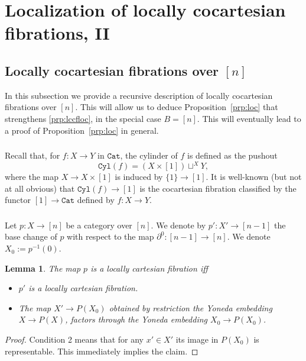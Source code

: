 \documentclass[12pt]{amsart}%
\newtheorem{lem}[subsubsection]{Lemma}
\newcommand{\Cat}{\mathtt{Cat}}
\newcommand{\Cyl}{\mathtt{Cyl}}
\begin{document}
\section{Localization of locally cocartesian fibrations, II}
\label{sec:strong}

\subsection{Locally cocartesian fibrations over $[n]$}

In this subsection we provide a recursive description of locally cocartesian fibrations over $[n]$. This will allow us to deduce
Proposition~\ref{prp:loc} that strengthens \ref{prp:lccfloc}, in the special case $B=[n]$. This will eventually lead to a proof of
Proposition~\ref{prp:loc} in general.

\subsubsection{}
Recall that, for $f:X\to Y$ in $\Cat$, the cylinder of $f$ is defined
as the pushout
$$
\Cyl(f)=(X\times[1])\sqcup^XY,
$$
where the map $X\to X\times[1]$ is induced by $\{1\}\to[1]$.
 It is well-known (but not at all obvious) that $\Cyl(f)\to[1]$ is the cocartesian fibration classified by the functor $[1]\to\Cat$ defined by
$f:X\to Y$. 

\subsubsection{}





Let $p:X\to[n]$ be a category over $[n]$. We denote by
$p':X'\to[n-1]$ the base change of $p$ with respect to
the map $\partial^0:[n-1]\to[n]$. We denote $X_0:=p^{-1}(0)$.
\begin{lem} The map $p$ is a locally cartesian fibration iff
\begin{itemize}
\item[1.] $p'$ is a locally cartesian fibration.
\item[2.] The map $X'\to P(X_0)$ obtained by restriction the Yoneda embedding $X\to P(X)$, factors through the Yoneda embedding $X_0\to P(X_0)$.
\end{itemize}
\end{lem}
\begin{proof}Condition 2 means that for any $x'\in X'$ its image in $P(X_0)$ is representable. This immediately implies the claim.
\end{proof}
\end{document}
